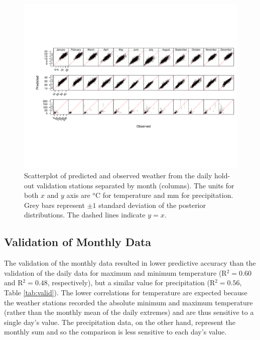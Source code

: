 \documentclass[12pt]{article}
\begin{document}
\begin{figure}
  \begin{center}
 \includegraphics[clip=true,trim= 1mm 4.8mm 0 5.2mm,width=\textwidth]{Figure4.pdf} \caption{Scatterplot of
   predicted and observed weather from the daily hold-out validation
   stations separated by month (columns). The units for both $x$ and $y$ axis
   are $^o$C for temperature and mm for precipitation.  Grey bars represent $\pm1$ standard deviation of the posterior
   distributions. The dashed lines indicate $y=x$.}
    \label{fig:predobsm}
\end{center}
\end{figure}

\subsection{Validation of Monthly Data}

The validation of the monthly data resulted in lower predictive accuracy than
the validation of the daily data for maximum and minimum temperature (R$^2=0.60$
and R$^2=0.48$, respectively), but a similar value for
precipitation (R$^2=0.56$, Table \ref{tab:valid}).  
The lower correlations for temperature are expected because the weather stations recorded the
absolute minimum and maximum temperature (rather than the monthly mean of the
daily extremes) and are thus sensitive to a single day's value.  
The precipitation data, on the other hand, represent the monthly sum and so
the comparison is less sensitive to each day's value. 
\end{document}
